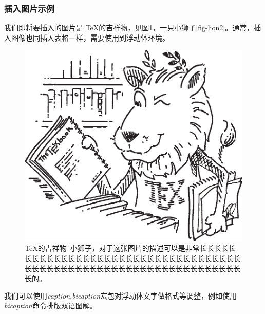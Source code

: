 \documentclass{ctexart} %
\begin{document}
            \subsubsection{插入图片示例}
            我们即将要插入的图片是 \TeX 的吉祥物，见图\ref{fig-lion}，一只小狮子\ref{fig-lion2}。通常，插入图像也同插入表格一样，需要使用到浮动体环境。
            \begin{figure}[htbp]
                \centering
                \includegraphics[scale=0.5]{ctanlion.eps}
                \caption[小狮子]{\TeX 的吉祥物--小狮子，对于这张图片的描述可以是非常长长长长长长长长长长长长长长长长长长长长长长长长长长长长长长长长长长长长长长长长长长长长长长长长长长长长长长长长长长长长长长长长长长的。}
                \label{fig-lion}
            \end{figure}
            我们可以使用\emph{caption,bicaption}宏包对浮动体文字做格式等调整，例如使用\emph{bicaption}命令排版双语图解。
\end{document}
